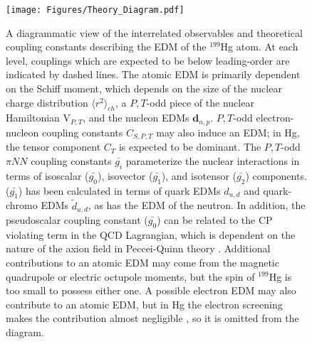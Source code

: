 \documentclass [10pt, twoside] {uwthesis}[2012/04/02]
\begin{document}
\begin{figure}[p] 
\begin{center}
\texttt{[image: Figures/Theory\_Diagram.pdf]}
\end{center}
\caption[EDM dependence on hadron EDMs, nuclear couplings, and fundamental physics]
{\narrower A diagrammatic view of the interrelated observables and theoretical coupling constants describing the EDM of the $^{199}$Hg atom. At each level, couplings which are expected to be below leading-order are indicated by dashed lines. The atomic EDM is primarily dependent on the Schiff moment, which depends on the size of the nuclear charge distribution $\langle r^2 \rangle _{ch}$, a $P,T$-odd piece of the nuclear Hamiltonian V$_{P,T}$, and the nucleon EDMs $\mathbf{d}_{n,p}$. $P,T$-odd electron-nucleon coupling constants $C_{S,P,T}$ may also induce an EDM; in Hg, the tensor component $C_T$ is expected to be dominant. The $P,T$-odd $\pi NN$ coupling constants $\bar{g_i}$ parameterize the nuclear interactions in terms of isoscalar ($\bar{g_0}$), isovector ($\bar{g_1}$), and isotensor ($\bar{g_2}$) components. ($\bar{g_1}$) has been calculated in terms of quark EDMs $d_{u,d}$ and quark-chromo EDMs $\tilde{d}_{u,d}$, as has the EDM of the neutron. In addition, the pseudoscalar coupling constant ($\bar{g_0}$) can be related to the CP violating term in the QCD Lagrangian, which is dependent on the nature of the axion field in Peccei-Quinn theory \cite{1977_Peccei_Quinn}. Additional contributions to an atomic EDM may come from the magnetic quadrupole or electric octupole moments, but the spin of $^{199}$Hg is too small to possess either one. A possible electron EDM may also contribute to an atomic EDM, but in Hg the electron screening makes the contribution almost negligible \cite{2004_Ginges_Flambaum_Fund._Symmetries_in_Atoms}, so it is omitted from the diagram.} \label{TheoryDiagram}
\end{figure}
 
\end{document}
